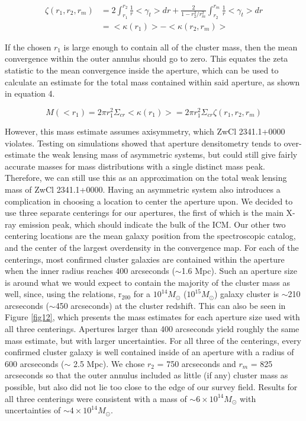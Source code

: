 \documentclass[onecolumn]{aastex}
\begin{document}
\begin{align}
\zeta(r_1,r_2,r_m) 
&= 2 \int_{r_1}^{r_2} \frac{1}{r}<\gamma_t>dr + \frac{2}{1-r_2^2/r_m^2}\int_{r_2}^{r_m} \frac{1}{r}<\gamma_t>dr \\
&= <\kappa (r_1)> - <\kappa (r_2,r_m)>
\end{align}

If the chosen $r_1$ is large enough to contain all of the cluster mass, then the mean convergence within the outer annulus should go to zero.  This equates the zeta statistic to the mean convergence inside the aperture, which can be used to calculate an estimate for the total mass contained within said aperture, as shown in equation 4.

\begin{equation}
M(<r_1) = 2\pi r_1^2\Sigma_{cr} <\kappa (r_1)> = 2\pi r_1^2\Sigma_{cr} \zeta(r_1,r_2,r_m)
\end{equation}

However, this mass estimate assumes axisymmetry, which ZwCl 2341.1+0000 violates.  Testing on simulations showed that aperture densitometry tends to over-estimate the weak lensing mass of asymmetric systems, but could still give fairly accurate masses for mass distributions with a single distinct mass peak.   Therefore, we can still use this as an approximation on the total weak lensing mass of ZwCl 2341.1+0000.  Having an asymmetric system also introduces a complication in choosing a location to center the aperture upon.  We decided to use three separate centerings for our apertures, the first of which is the main X-ray emission peak, which should indicate the bulk of the ICM.  Our other two centering locations are the mean galaxy position from the spectroscopic catalog, and the center of the largest overdensity in the convergence map.  For each of the centerings, most confirmed cluster galaxies are contained within the aperture when the inner radius reaches 400 arcseconds ($\sim$1.6 Mpc).  Such an aperture size is around what we would expect to contain the majority of the cluster mass as well, since, using the \cite{Duffy08} relations, r$_{200}$ for a $10^{14} M_\odot$ ($10^{15} M_\odot$) galaxy cluster is $\sim$210 arcseconds ($\sim$450 arcseconds) at the cluster redshift.  This can also be seen in Figure \ref{fig12}, which presents the mass estimates for each aperture size used with all three centerings.  Apertures larger than 400 arcseconds yield roughly the same mass estimate, but with larger uncertainties.  For all three of the centerings, every confirmed cluster galaxy is well contained inside of an aperture with a radius of 600 arcseconds ($\sim$ 2.5 Mpc).  We chose $r_2$ = 750 arcseconds and $r_m$ = 825 arcseconds so that the outer annulus included as little (if any) cluster mass as possible, but also did not lie too close to the edge of our survey field.  Results for all three centerings were consistent with a mass of $\sim 6 \times 10^{14} M_\odot$ with uncertainties of $\sim 4 \times 10^{14} M_\odot$.
\end{document}
